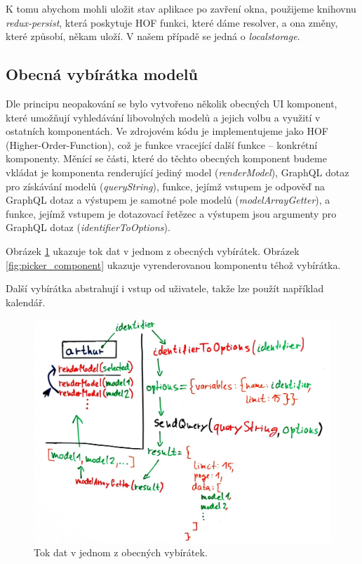 K tomu abychom mohli uložit stav aplikace po zavření okna, použijeme knihovnu \textit{redux-persist}, která poskytuje
HOF funkci, které dáme resolver, a ona změny, které způsobí, někam uloží. V našem případě se jedná o \textit{localstorage}.

\subsection{Obecná vybírátka modelů}

Dle principu neopakování se bylo vytvořeno několik obecných UI komponent, které umožňují vyhledávání libovolných
modelů a jejich volbu a využití v ostatních komponentách. Ve zdrojovém kódu je implementujeme jako
HOF (Higher-Order-Function), což je funkce vracející další funkce -- konkrétní komponenty.
Měnící se části, které do těchto obecných komponent budeme vkládat je komponenta renderující jediný model
(\textit{renderModel}),
GraphQL dotaz pro získávání modelů (\textit{queryString}), funkce, jejímž vstupem je odpověď na GraphQL dotaz a výstupem je
samotné pole modelů (\textit{modelArrayGetter}), a funkce, jejímž vstupem je dotazovací řetězec a výstupem jsou
argumenty pro GraphQL dotaz (\textit{identifierToOptions}).

Obrázek \ref{fig:picker_lifecycle} ukazuje tok dat v jednom z obecných vybírátek.
Obrázek \ref{fig:picker_component} ukazuje vyrenderovanou komponentu téhož vybírátka.

Další vybírátka abstrahují i vstup od uživatele, takže lze použít například kalendář.

\begin{figure}[!htb] \centering
  \includegraphics[width=145mm]{../img/picker_lifecycle.jpg}
  \caption{Tok dat v jednom z obecných vybírátek.}
  \label{fig:picker_lifecycle}
\end{figure}

